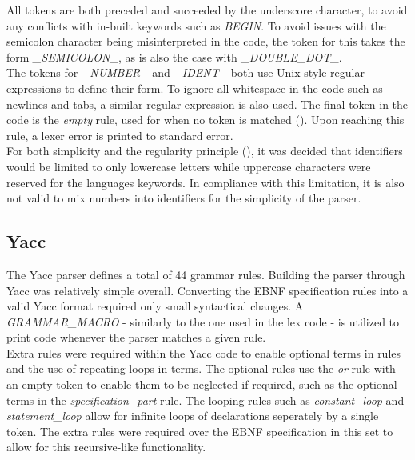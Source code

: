 \documentclass[]{article}
\begin{document}
All tokens are both preceded and succeeded by the underscore character, to avoid any conflicts with in-built keywords such as \textit{BEGIN}. To avoid issues with the semicolon character being misinterpreted in the code, the token for this takes the form \textit{_SEMICOLON_}, as is also the case with \textit{_DOUBLE_DOT_}. \\

The tokens for \textit{_NUMBER_} and \textit{_IDENT_} both use Unix style regular expressions to define their form. To ignore all whitespace in the code such as newlines and tabs, a similar regular expression is also used. The final token in the code is the \textit{empty} rule, used for when no token is matched (\cite{Levine}). Upon reaching this rule, a lexer error is printed to standard error.\\

For both simplicity and the regularity principle (\cite{Sebesta}), it was decided that identifiers would be limited to only lowercase letters while uppercase characters were reserved for the languages keywords. In compliance with this limitation, it is also not valid to mix numbers into identifiers for the simplicity of the parser.

\vspace{0.5cm}
\subsection*{Yacc}
\vspace{0.5cm}

The Yacc parser defines a total of 44 grammar rules. Building the parser through Yacc was relatively simple overall. Converting the EBNF specification rules into a valid Yacc format required only small syntactical changes. A \textit{GRAMMAR_MACRO} - similarly to the one used in the lex code - is utilized to print code whenever the parser matches a given rule.\\

Extra rules were required within the Yacc code to enable optional terms in rules and the use of repeating loops in terms. The optional rules use the \textit{or} rule with an empty token to enable them to be neglected if required, such as the optional terms in the \textit{specification_part} rule. The looping rules such as \textit{constant_loop} and \textit{statement_loop} allow for infinite loops of declarations seperately by a single token. The extra rules were required over the EBNF specification in this set to allow for this recursive-like functionality.
\end{document}
